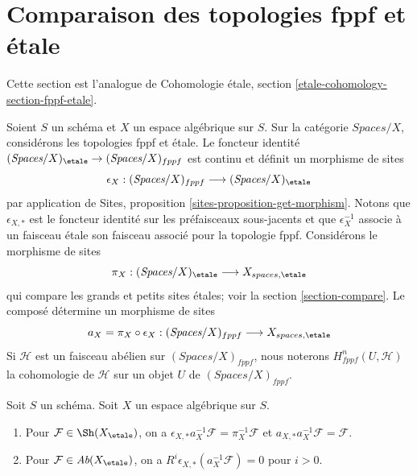 






\section{Comparaison des topologies fppf et étale}
\label{section-fppf-etale}

\noindent
Cette section est l'analogue de Cohomologie étale, section
\ref{etale-cohomology-section-fppf-etale}.

\medskip\noindent
Soient $S$ un schéma et $X$ un espace algébrique sur $S$.
Sur la catégorie $\textit{Spaces}/X$, considérons les topologies fppf
et étale. Le foncteur identité
$(\textit{Spaces}/X)_\etale \to (\textit{Spaces}/X)_{fppf}$
est continu et définit un morphisme de sites
$$
\epsilon_X :
(\textit{Spaces}/X)_{fppf} \longrightarrow (\textit{Spaces}/X)_\etale
$$
par application de Sites, proposition \ref{sites-proposition-get-morphism}.
Notons que $\epsilon_{X, *}$ est le foncteur identité sur les préfaisceaux
sous-jacents et que $\epsilon_X^{-1}$ associe à un faisceau étale son
faisceau associé pour la topologie fppf.
Considérons le morphisme de sites
$$
\pi_X : (\textit{Spaces}/X)_\etale \longrightarrow X_{spaces, \etale}
$$
qui compare les grands et petits sites étales; voir la section \ref{section-compare}.
Le composé détermine un morphisme de sites
$$
a_X = \pi_X \circ \epsilon_X :
(\textit{Spaces}/X)_{fppf}
\longrightarrow
X_{spaces, \etale}
$$
Si $\mathcal{H}$ est un faisceau abélien sur $(\textit{Spaces}/X)_{fppf}$,
nous noterons $H^n_{fppf}(U, \mathcal{H})$ la cohomologie de
$\mathcal{H}$ sur un objet $U$ de $(\textit{Spaces}/X)_{fppf}$.

\begin{lemma}
\label{lemma-comparison-fppf-etale}
Soit $S$ un schéma. Soit $X$ un espace algébrique sur $S$.
\begin{enumerate}
\item Pour $\mathcal{F} \in \Sh(X_\etale)$, on a
$\epsilon_{X, *}a_X^{-1}\mathcal{F} = \pi_X^{-1}\mathcal{F}$
et $a_{X, *}a_X^{-1}\mathcal{F} = \mathcal{F}$.
\item Pour $\mathcal{F} \in \textit{Ab}(X_\etale)$, on a
$R^i\epsilon_{X, *}(a_X^{-1}\mathcal{F}) = 0$ pour $i > 0$.
\end{enumerate}
\end{lemma}

